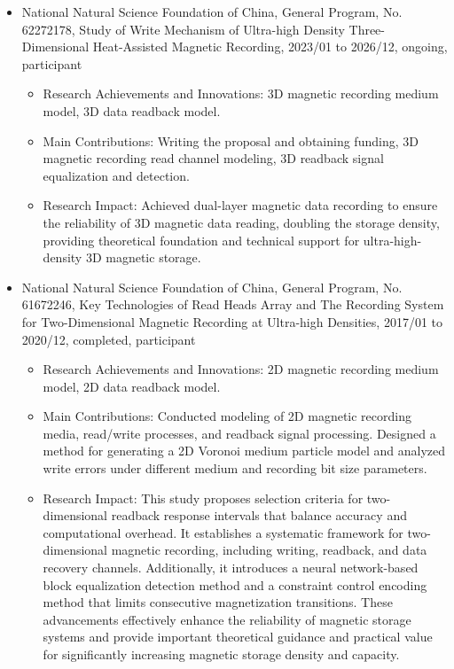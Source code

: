 \documentclass[en]{resume}
\begin{document}
\begin{itemize}
  \item National Natural Science Foundation of China, General Program, No. 62272178, 
  Study of Write Mechanism of Ultra-high Density Three-Dimensional Heat-Assisted Magnetic Recording, 2023/01 to 2026/12, ongoing, participant
  \begin{itemize}
    \item Research Achievements and Innovations: 3D magnetic recording medium model, 3D data readback model.
    \item Main Contributions: Writing the proposal and obtaining funding, 3D magnetic recording read channel modeling, 3D readback signal equalization and detection.
    \item Research Impact: Achieved dual-layer magnetic data recording to ensure the reliability of 3D magnetic data reading, doubling the storage density, providing theoretical foundation and technical support for ultra-high-density 3D magnetic storage.
  \end{itemize}

  \item National Natural Science Foundation of China, General Program, No. 61672246, Key Technologies of Read Heads Array and The Recording System for
  Two-Dimensional Magnetic Recording at Ultra-high Densities, 2017/01 to 2020/12, completed, participant
  \begin{itemize}
    \item Research Achievements and Innovations: 2D magnetic recording medium model, 2D data readback model.
    \item Main Contributions: Conducted modeling of 2D magnetic recording media, read/write processes, and readback signal processing. Designed a method for generating a 2D Voronoi medium particle model and analyzed write errors under different medium and recording bit size parameters.
    \item Research Impact: This study proposes selection criteria for two-dimensional readback response intervals that balance accuracy and computational overhead. It establishes a systematic framework for two-dimensional magnetic recording, including writing, readback, and data recovery channels. Additionally, it introduces a neural network-based block equalization detection method and a constraint control encoding method that limits consecutive magnetization transitions. These advancements effectively enhance the reliability of magnetic storage systems and provide important theoretical guidance and practical value for significantly increasing magnetic storage density and capacity.
  \end{itemize}


\end{itemize}
\end{document}
